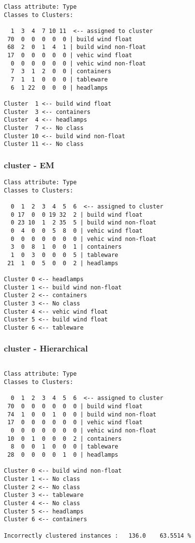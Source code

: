 \documentclass[a4paper]{article}
\begin{document}
\begin{verbatim}
Class attribute: Type
Classes to Clusters:

  1  3  4  7 10 11  <-- assigned to cluster
 70  0  0  0  0  0 | build wind float
 68  2  0  1  4  1 | build wind non-float
 17  0  0  0  0  0 | vehic wind float
  0  0  0  0  0  0 | vehic wind non-float
  7  3  1  2  0  0 | containers
  7  1  1  0  0  0 | tableware
  6  1 22  0  0  0 | headlamps

Cluster  1 <-- build wind float
Cluster  3 <-- containers
Cluster  4 <-- headlamps
Cluster  7 <-- No class
Cluster 10 <-- build wind non-float
Cluster 11 <-- No class
\end{verbatim}

\subsubsection{cluster - EM}

\begin{verbatim}
Class attribute: Type
Classes to Clusters:

  0  1  2  3  4  5  6  <-- assigned to cluster
  0 17  0  0 19 32  2 | build wind float
  0 23 10  1  2 35  5 | build wind non-float
  0  4  0  0  5  8  0 | vehic wind float
  0  0  0  0  0  0  0 | vehic wind non-float
  3  0  8  1  0  0  1 | containers
  1  0  3  0  0  0  5 | tableware
 21  1  0  5  0  0  2 | headlamps

Cluster 0 <-- headlamps
Cluster 1 <-- build wind non-float
Cluster 2 <-- containers
Cluster 3 <-- No class
Cluster 4 <-- vehic wind float
Cluster 5 <-- build wind float
Cluster 6 <-- tableware
\end{verbatim}


\subsubsection{cluster - Hierarchical}

\begin{verbatim}

Class attribute: Type
Classes to Clusters:

  0  1  2  3  4  5  6  <-- assigned to cluster
 70  0  0  0  0  0  0 | build wind float
 74  1  0  0  1  0  0 | build wind non-float
 17  0  0  0  0  0  0 | vehic wind float
  0  0  0  0  0  0  0 | vehic wind non-float
 10  0  1  0  0  0  2 | containers
  8  0  0  1  0  0  0 | tableware
 28  0  0  0  0  1  0 | headlamps

Cluster 0 <-- build wind non-float
Cluster 1 <-- No class
Cluster 2 <-- No class
Cluster 3 <-- tableware
Cluster 4 <-- No class
Cluster 5 <-- headlamps
Cluster 6 <-- containers

Incorrectly clustered instances :	136.0	 63.5514 %
\end{verbatim}
\end{document}
